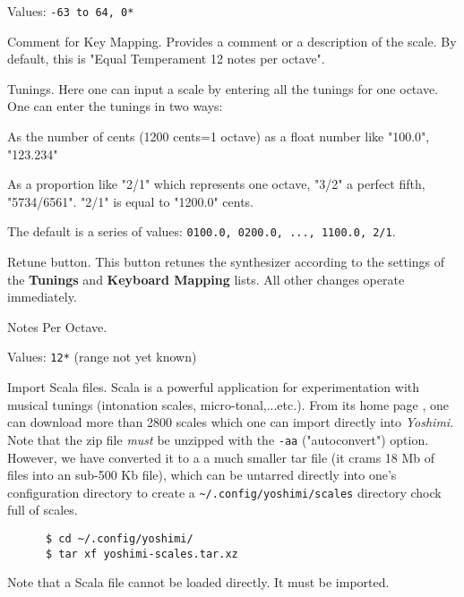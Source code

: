    Values: \texttt{-63 to 64, 0*}

   Comment for Key Mapping.
   Provides a comment or a description of the scale.
   By default, this is "Equal Temperament 12 notes per octave".

   Tunings.
   Here one can input a scale by entering all the tunings for one octave. 
   One can enter the tunings in two ways: 

   \begin{enumber}
      \item As the number of cents (1200 cents=1 octave) as a float number
         like "100.0", "123.234"
      \item As a proportion like "2/1" which represents one octave, "3/2" a
         perfect fifth, "5734/6561".  "2/1" is equal to "1200.0" cents.
   \end{enumber}

   The default is a series of values:
   \texttt{0100.0, 0200.0, ..., 1100.0, 2/1}.

   Retune button.
   This button retunes the synthesizer according to the settings of
   the \textbf{Tunings} and \textbf{Keyboard Mapping} lists.
   All other changes operate immediately.

   Notes Per Octave.

   Values: \texttt{12*} (range not yet known)

   Import Scala files.
   Scala is a powerful application for experimentation with musical tunings
   (intonation scales, micro-tonal,...etc.). From its home page \cite{scala},
   one can download more than 2800 scales which one can import directly into
   \textsl{Yoshimi}.  Note that the zip file \textsl{must} be unzipped with
   the \texttt{-aa} ("autoconvert") option.  However, we have converted it to a
   a much smaller tar file (it crams 18 Mb of files into an sub-500 Kb file),
   which can be untarred directly into
   one's configuration directory to create a
   \texttt{\textasciitilde/.config/yoshimi/scales} directory chock full of
   scales.

    \begin{verbatim}
      $ cd ~/.config/yoshimi/
      $ tar xf yoshimi-scales.tar.xz
    \end{verbatim}

    Note that a Scala file cannot be loaded directly.  It must be imported.

